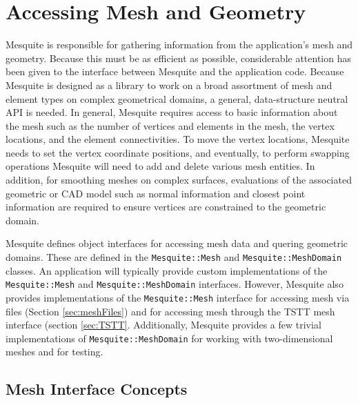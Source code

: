 \chapter{Accessing Mesh and Geometry}
\label{sec:meshes}

Mesquite is responsible for gathering information from the
application's mesh and geometry.  Because this must be as efficient as
possible, considerable attention has been given to the interface
between Mesquite and the application code.  Because Mesquite is
designed as a library to work on a broad assortment of mesh and
element types on complex geometrical domains, a general,
data-structure neutral API is needed.  In general, Mesquite requires
access to basic information about the mesh such as the number of
vertices and elements in the mesh, the vertex locations, and the
element connectivities.  To move the vertex locations, Mesquite needs
to set the vertex coordinate positions, and eventually, to perform
swapping operations Mesquite will need to add and delete various mesh
entities.  In addition, for smoothing meshes on complex surfaces,
evaluations of the associated geometric or CAD model such as normal
information and closest point information are required to ensure
vertices are constrained to the geometric domain.

Mesquite defines object interfaces for accessing mesh data and quering 
geometric domains.  These are defined in the {\tt Mesquite::Mesh} and 
{\tt Mesquite::MeshDomain} classes.  An application will typically provide custom implementations of the {\tt Mesquite::Mesh} and {\tt Mesquite::MeshDomain} interfaces.  However, Mesquite also provides 
implementations of the {\tt Mesquite::Mesh} interface for accessing 
mesh via files (Section \ref{sec:meshFiles}) and for accessing mesh
through the TSTT mesh interface (section \ref{sec:TSTT}.  Additionally, Mesquite provides a few trivial implementations of {\tt Mesquite::MeshDomain} for working with two-dimensional meshes and for testing.

\section{Mesh Interface Concepts}

